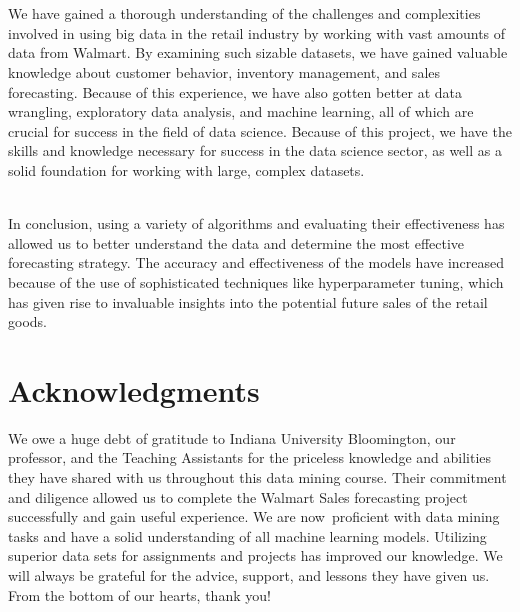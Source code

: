 \documentclass[fleqn,10pt]{SelfArx} %
\begin{document}
\\\item \\We have gained a thorough understanding of the challenges and complexities involved in using big data in the retail industry by working with vast amounts of data from Walmart. By examining such sizable datasets, we have gained valuable knowledge about customer behavior, inventory management, and sales forecasting. Because of this experience, we have also gotten better at data wrangling, exploratory data analysis, and machine learning, all of which are crucial for success in the field of data science. Because of this project, we have the skills and knowledge necessary for success in the data science sector, as well as a solid foundation for working with large, complex datasets.


\item \\In conclusion, using a variety of algorithms and evaluating their effectiveness has allowed us to better understand the data and determine the most effective forecasting strategy.  The accuracy and effectiveness of the models have increased because of the use of sophisticated techniques like hyperparameter tuning, which has given rise to invaluable insights into the potential future sales of the retail goods.

\section*{Acknowledgments} %
We owe a huge debt of gratitude to Indiana University Bloomington, our professor, and the Teaching Assistants for the priceless knowledge and abilities they have shared with us throughout this data mining course. Their commitment and diligence allowed us to complete the Walmart Sales forecasting project successfully and gain useful experience. We are now proficient with data mining tasks and have a solid understanding of all machine learning models. Utilizing superior data sets for assignments and projects has improved our knowledge. We will always be grateful for the advice, support, and lessons they have given us. From the bottom of our hearts, thank you!


\end{document}
